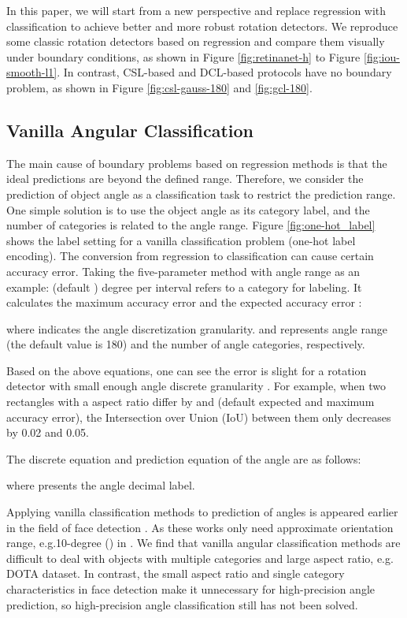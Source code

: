 \documentclass[10pt,journal,compsoc]{IEEEtran}
\begin{document}
In this paper, we will start from a new perspective and replace regression with classification to achieve better and more robust rotation detectors. We reproduce some classic rotation detectors based on regression and compare them visually under boundary conditions, as shown in Figure \ref{fig:retinanet-h} to Figure \ref{fig:iou-smooth-l1}. In contrast, CSL-based and DCL-based protocols have no boundary problem, as shown in Figure \ref{fig:csl-gauss-180} and \ref{fig:gcl-180}.

\subsection{Vanilla Angular Classification}
The main cause of boundary problems based on regression methods is that the ideal predictions are beyond the defined range. Therefore, we consider the prediction of object angle as a classification task to restrict the prediction range. One simple solution is to use the object angle as its category label, and the number of categories is related to the angle range. Figure \ref{fig:one-hot_label} shows the label setting for a vanilla classification problem (one-hot label encoding). The conversion from regression to classification can cause certain accuracy error. Taking the five-parameter method with  angle range as an example:  (default ) degree per interval refers to a category for labeling. It calculates the maximum accuracy error  and the expected accuracy error :

where  indicates the angle discretization granularity.  and  represents angle range (the default value is 180) and the number of angle categories, respectively.  

Based on the above equations, one can see the error is slight for a rotation detector with small enough angle discrete granularity . For example, when two rectangles with a  aspect ratio differ by  and  (default expected and maximum accuracy error), the Intersection over Union (IoU) between them only decreases by 0.02 and 0.05. 

The discrete equation and prediction equation of the angle are as follows:

where  presents the angle decimal label.

Applying vanilla classification methods to prediction of angles is appeared earlier in the field of face detection \cite{huang2007high, rowley1998rotation, shi2018real}. As these works only need approximate orientation range, e.g.10-degree () in \cite{rowley1998rotation}. We find that vanilla angular classification methods are difficult to deal with objects with multiple categories and large aspect ratio, e.g. DOTA dataset. In contrast, the small aspect ratio and single category characteristics in face detection make it unnecessary for high-precision angle prediction, so high-precision angle classification still has not been solved.
\end{document}
